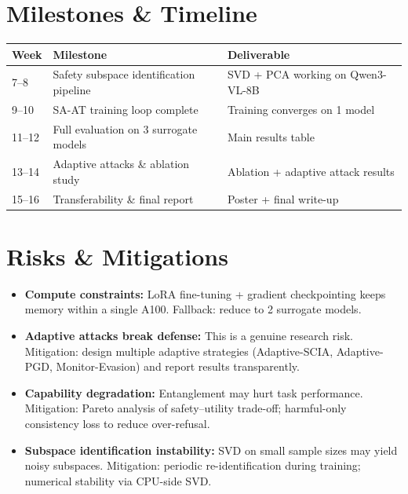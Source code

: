 \documentclass[11pt]{article}
\begin{document}
\section{Milestones \& Timeline}

\begin{tabular}{@{}lll@{}}
\toprule
\textbf{Week} & \textbf{Milestone} & \textbf{Deliverable} \\
\midrule
7--8 & Safety subspace identification pipeline & SVD + PCA working on Qwen3-VL-8B \\
9--10 & SA-AT training loop complete & Training converges on 1 model \\
11--12 & Full evaluation on 3 surrogate models & Main results table \\
13--14 & Adaptive attacks \& ablation study & Ablation + adaptive attack results \\
15--16 & Transferability \& final report & Poster + final write-up \\
\bottomrule
\end{tabular}

\section{Risks \& Mitigations}

\begin{itemize}
  \item \textbf{Compute constraints:} LoRA fine-tuning + gradient checkpointing keeps memory within a single A100. Fallback: reduce to 2 surrogate models.
  \item \textbf{Adaptive attacks break defense:} This is a genuine research risk. Mitigation: design multiple adaptive strategies (Adaptive-SCIA, Adaptive-PGD, Monitor-Evasion) and report results transparently.
  \item \textbf{Capability degradation:} Entanglement may hurt task performance. Mitigation: Pareto analysis of safety--utility trade-off; harmful-only consistency loss to reduce over-refusal.
  \item \textbf{Subspace identification instability:} SVD on small sample sizes may yield noisy subspaces. Mitigation: periodic re-identification during training; numerical stability via CPU-side SVD.
\end{itemize}
\end{document}
